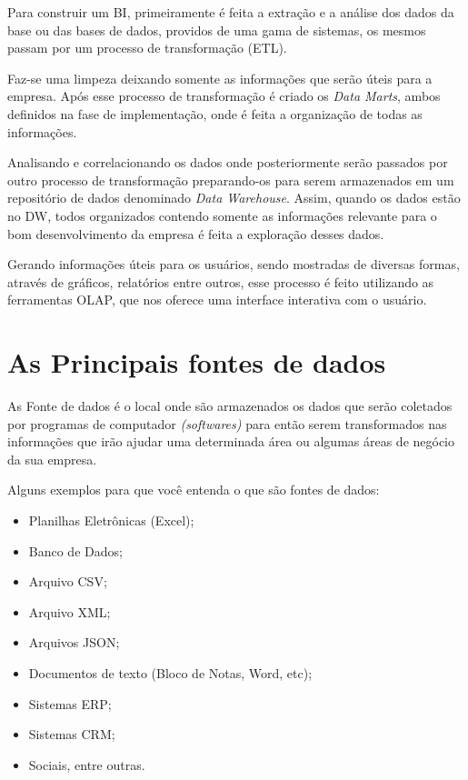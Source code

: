 Para construir um BI, primeiramente \'{e} feita a extra\c{c}\~{a}o e a an\'{a}lise dos dados da base ou das bases de dados, providos de uma gama de sistemas, os mesmos passam por um processo de transforma\c{c}\~{a}o (ETL).  

Faz-se uma limpeza deixando somente as informa\c{c}ões que ser\~{a}o úteis para a empresa. Após esse processo de transforma\c{c}\~{a}o \'{e} criado os \textit{Data Marts}, ambos definidos na fase de implementa\c{c}\~{a}o, onde \'{e} feita a organiza\c{c}\~{a}o de todas as informa\c{c}ões. 

Analisando e correlacionando os dados onde posteriormente ser\~{a}o passados por outro processo de transforma\c{c}\~{a}o preparando-os para serem armazenados em um repositório de dados denominado \textit{Data Warehouse}. 
Assim, quando os dados est\~{a}o no DW, todos organizados contendo somente as informa\c{c}ões relevante para o bom desenvolvimento da empresa \'{e} feita a explora\c{c}\~{a}o desses dados. 

Gerando informa\c{c}ões úteis para os usu\'{a}rios, sendo mostradas de diversas formas, atrav\'{e}s de gr\'{a}ficos, relatórios entre outros, esse processo \'{e} feito utilizando as ferramentas OLAP, que nos oferece uma interface interativa com o usu\'{a}rio.

\section{As Principais fontes de dados}

As Fonte de dados \'{e} o local onde s\~{a}o armazenados os dados que ser\~{a}o coletados por programas de computador \textit{(softwares)} para ent\~{a}o serem transformados nas informa\c{c}ões que ir\~{a}o ajudar uma determinada \'{a}rea ou algumas \'{a}reas de negócio da sua empresa.

Alguns exemplos para que você entenda o que s\~{a}o fontes de dados:

\begin{itemize}

    \item Planilhas Eletrônicas (Excel);
    \item Banco de Dados;
    \item Arquivo CSV;
    \item Arquivo XML;
    \item Arquivos JSON;
    \item Documentos de texto (Bloco de Notas, Word, etc);
    \item Sistemas ERP;
    \item Sistemas CRM;
    \item Sociais, entre outras.
    
\end{itemize}

